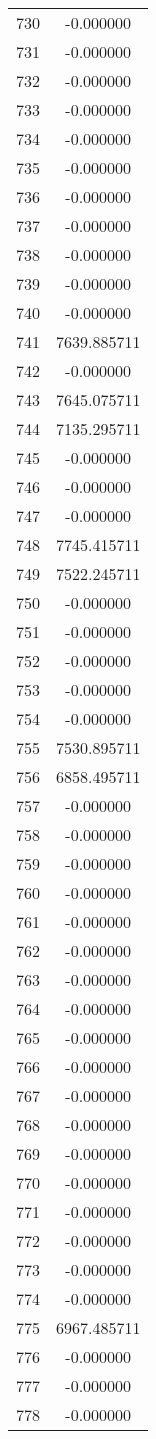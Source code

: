 \documentclass[12pt]{article}
\begin{document}
\begin{longtable}{@{}cc@{}}
730 & -0.000000 \\
731 & -0.000000 \\
732 & -0.000000 \\
733 & -0.000000 \\
734 & -0.000000 \\
735 & -0.000000 \\
736 & -0.000000 \\
737 & -0.000000 \\
738 & -0.000000 \\
739 & -0.000000 \\
740 & -0.000000 \\
741 & 7639.885711 \\
742 & -0.000000 \\
743 & 7645.075711 \\
744 & 7135.295711 \\
745 & -0.000000 \\
746 & -0.000000 \\
747 & -0.000000 \\
748 & 7745.415711 \\
749 & 7522.245711 \\
750 & -0.000000 \\
751 & -0.000000 \\
752 & -0.000000 \\
753 & -0.000000 \\
754 & -0.000000 \\
755 & 7530.895711 \\
756 & 6858.495711 \\
757 & -0.000000 \\
758 & -0.000000 \\
759 & -0.000000 \\
760 & -0.000000 \\
761 & -0.000000 \\
762 & -0.000000 \\
763 & -0.000000 \\
764 & -0.000000 \\
765 & -0.000000 \\
766 & -0.000000 \\
767 & -0.000000 \\
768 & -0.000000 \\
769 & -0.000000 \\
770 & -0.000000 \\
771 & -0.000000 \\
772 & -0.000000 \\
773 & -0.000000 \\
774 & -0.000000 \\
775 & 6967.485711 \\
776 & -0.000000 \\
777 & -0.000000 \\
778 & -0.000000 \\

\end{longtable}
\end{document}
